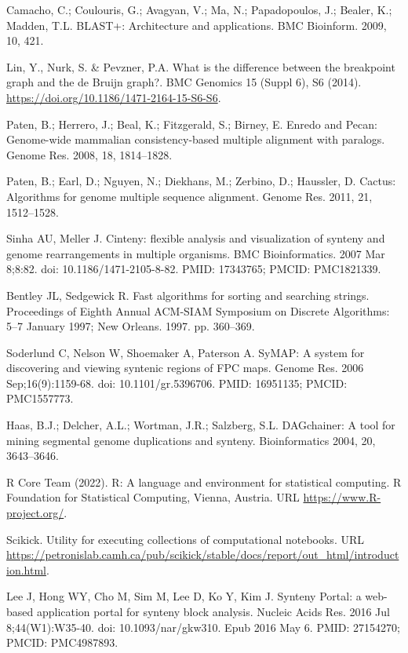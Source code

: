 \documentclass[12pt]{article}
\begin{document}
\begin{thebibliography}{99}
 Camacho, C.; Coulouris, G.; Avagyan, V.; Ma, N.;
Papadopoulos, J.; Bealer, K.; Madden, T.L. BLAST+: Architecture and
applications. BMC Bioinform. 2009, 10, 421.

 Lin, Y., Nurk, S. \& Pevzner, P.A. What is the difference
between the breakpoint graph and the de Bruijn graph?. BMC Genomics 15
(Suppl 6), S6 (2014). \url{https://doi.org/10.1186/1471-2164-15-S6-S6}.

 Paten, B.; Herrero, J.; Beal, K.; Fitzgerald, S.; Birney,
E. Enredo and Pecan: Genome-wide mammalian consistency-based multiple alignment
with paralogs. Genome Res. 2008, 18, 1814–1828.

 Paten, B.; Earl, D.; Nguyen, N.; Diekhans, M.; Zerbino, D.;
Haussler, D. Cactus: Algorithms for genome multiple sequence alignment.
Genome Res. 2011, 21, 1512–1528.

 Sinha AU, Meller J. Cinteny: flexible analysis and
visualization of synteny and genome rearrangements in multiple organisms.
BMC Bioinformatics. 2007 Mar 8;8:82. doi: 10.1186/1471-2105-8-82.
PMID: 17343765; PMCID: PMC1821339.

 Bentley JL, Sedgewick R. Fast algorithms for sorting and searching
strings. Proceedings of Eighth Annual ACM-SIAM Symposium on Discrete
Algorithms: 5–7 January 1997; New Orleans. 1997. pp. 360–369.

 Soderlund C, Nelson W, Shoemaker A, Paterson A. SyMAP: A system
for discovering and viewing syntenic regions of FPC maps. Genome Res. 2006
Sep;16(9):1159-68. doi: 10.1101/gr.5396706. PMID: 16951135; PMCID: PMC1557773.

 Haas, B.J.; Delcher, A.L.; Wortman, J.R.; Salzberg, S.L.
DAGchainer: A tool for mining segmental genome duplications and synteny.
Bioinformatics 2004, 20, 3643–3646.

 R Core Team (2022).
R: A language and environment for statistical computing. R Foundation
for Statistical Computing, Vienna, Austria. URL
\url{https://www.R-project.org/}.

 Scikick. Utility for executing collections of computational
notebooks. URL
\url{https://petronislab.camh.ca/pub/scikick/stable/docs/report/out\_html/introduction.html}.

 Lee J, Hong WY, Cho M, Sim M, Lee D, Ko Y, Kim J. Synteny
Portal: a web-based application portal for synteny block analysis. Nucleic
Acids Res. 2016 Jul 8;44(W1):W35-40. doi: 10.1093/nar/gkw310. Epub 2016 May 6.
PMID: 27154270; PMCID: PMC4987893.


\end{thebibliography}
\end{document}
